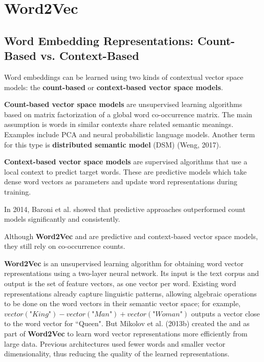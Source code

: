 \section{Word2Vec} \label{sec:Word2Vec}

\subsection{Word Embedding Representations: Count-Based vs. Context-Based} \label{sec:CountVsContextModels}
 
Word embeddings can be learned using two kinds of contextual vector space models: the \textbf{count-based} or \textbf{context-based vector space models}. 

\textbf{Count-based vector space models} are unsupervised learning algorithms based on matrix factorization of a global word co-occurrence matrix. The main assumption is words in similar contexts share related semantic meanings. Examples include PCA and neural probabilistic language models. Another term for this type is \textbf{distributed semantic model} (DSM) (Weng, 2017). 

\textbf{Context-based vector space models} are supervised algorithms that use a local context to predict target words. These are predictive models which take dense word vectors as parameters and update word representations during training.

In 2014, Baroni et al. showed that predictive approaches outperformed count models significantly and consistently. 

Although \textbf{Word2Vec} and  are predictive and context-based vector space models, they still rely on co-occurrence counts. 

\textbf{Word2Vec} is an unsupervised learning algorithm for obtaining word vector representations using a two-layer neural network. Its input is the text corpus and output is the set of feature vectors, as one vector per word. Existing word representations already capture linguistic patterns, allowing algebraic operations to be done on the word vectors in their semantic vector space; for example, $vector(\textit{"King"}) - vector(\textit{"Man"}) + vector(\textit{"Woman"})$ outputs a vector close to the word vector for ``Queen". But Mikolov et al. (2013b) created the  and  as part of \textbf{Word2Vec} to learn word vector representations more efficiently from large data. Previous architectures used fewer words and smaller vector dimensionality, thus reducing the quality of the learned representations. 

